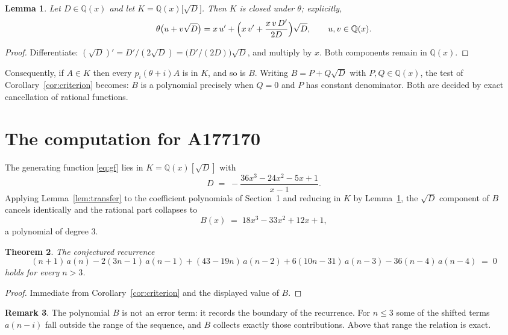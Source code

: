 \documentclass[11pt,a4paper]{article}
\theoremstyle{plain}
\newtheorem{theorem}{Theorem}
\newtheorem{lemma}[theorem]{Lemma}
\theoremstyle{definition}
\newtheorem{remark}[theorem]{Remark}
\begin{document}
\begin{lemma}\label{lem:field}
Let $D\in\mathbb{Q}(x)$ and let $K=\mathbb{Q}(x)\bigl[\sqrt{D}\bigr]$. Then $K$ is closed
under $\theta$; explicitly,
\[
\theta\bigl(u+v\sqrt{D}\bigr)=x\,u'+\Bigl(x\,v'+\frac{x\,v\,D'}{2D}\Bigr)\sqrt{D},
\qquad u,v\in\mathbb{Q}(x).
\]
\end{lemma}

\begin{proof}
Differentiate: $(\sqrt{D})'=D'/(2\sqrt{D})=\bigl(D'/(2D)\bigr)\sqrt{D}$, and multiply by
$x$. Both components remain in $\mathbb{Q}(x)$.
\end{proof}

Consequently, if $A\in K$ then every $p_{i}(\theta+i)A$ is in $K$, and so is $B$. Writing
$B=P+Q\sqrt{D}$ with $P,Q\in\mathbb{Q}(x)$, the test of Corollary~\ref{cor:criterion}
becomes: $B$ is a polynomial precisely when $Q=0$ and $P$ has constant denominator. Both
are decided by exact cancellation of rational functions.

\section{The computation for A177170}

The generating function \eqref{eq:gf} lies in $K=\mathbb{Q}(x)[\sqrt{D}]$ with
\[
D \;=\; - \frac{36 x^{3} - 24 x^{2} - 5 x + 1}{x - 1} .
\]
Applying Lemma~\ref{lem:transfer} to the coefficient polynomials of Section~1 and reducing
in $K$ by Lemma~\ref{lem:field}, the $\sqrt{D}$ component of $B$ cancels identically and
the rational part collapses to
\[
B(x)\;=\;18 x^{3} - 33 x^{2} + 12 x + 1 ,
\]
a polynomial of degree $3$.

\begin{theorem}
The conjectured recurrence
\[
(n + 1)\,a(n) -  2 \left(3 n - 1\right)\,a(n-1) + (43 - 19 n)\,a(n-2) + 6 \left(10 n - 31\right)\,a(n-3) -  36 \left(n - 4\right)\,a(n-4) \;=\;0
\]
holds for every $n>3$.
\end{theorem}

\begin{proof}
Immediate from Corollary~\ref{cor:criterion} and the displayed value of $B$.
\end{proof}

\begin{remark}
The polynomial $B$ is not an error term: it records the boundary of the recurrence. For
$n\le3$ some of the shifted terms $a(n-i)$ fall outside the range of the sequence,
and $B$ collects exactly those contributions. Above that range the relation is exact.
\end{remark}
\end{document}
